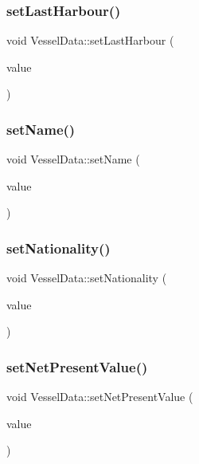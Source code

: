 \subsubsection{\texorpdfstring{setLastHarbour()}{setLastHarbour()}}
{\footnotesize\ttfamily void Vessel\+Data\+::set\+Last\+Harbour (\begin{DoxyParamCaption}\item[{int}]{value }\end{DoxyParamCaption})}

\mbox{\label{class_vessel_data_ab7d2330f2149fa478b59a7828df89533}} 
\subsubsection{\texorpdfstring{setName()}{setName()}}
{\footnotesize\ttfamily void Vessel\+Data\+::set\+Name (\begin{DoxyParamCaption}\item[{const Q\+String \&}]{value }\end{DoxyParamCaption})}

\mbox{\label{class_vessel_data_a063991ce28cb21af606e2b05ea4c46fe}} 
\subsubsection{\texorpdfstring{setNationality()}{setNationality()}}
{\footnotesize\ttfamily void Vessel\+Data\+::set\+Nationality (\begin{DoxyParamCaption}\item[{int}]{value }\end{DoxyParamCaption})}

\mbox{\label{class_vessel_data_a82a24b800ed3b657ad8f83d5b59b4a83}} 
\subsubsection{\texorpdfstring{setNetPresentValue()}{setNetPresentValue()}}
{\footnotesize\ttfamily void Vessel\+Data\+::set\+Net\+Present\+Value (\begin{DoxyParamCaption}\item[{double}]{value }\end{DoxyParamCaption})}

